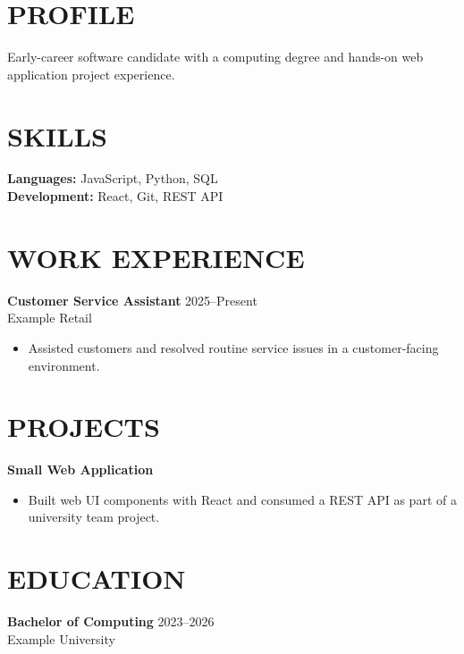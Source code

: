 

\section{PROFILE}
Early-career software candidate with a computing degree and hands-on web application project experience.
\section{SKILLS}
\textbf{Languages:} JavaScript, Python, SQL\\
\textbf{Development:} React, Git, REST API
\section{WORK EXPERIENCE}
\textbf{Customer Service Assistant} \hfill 2025--Present\\
Example Retail
\begin{itemize}
\item Assisted customers and resolved routine service issues in a customer-facing environment.
\end{itemize}
\section{PROJECTS}
\textbf{Small Web Application}
\begin{itemize}
\item Built web UI components with React and consumed a REST API as part of a university team project.
\end{itemize}
\section{EDUCATION}
\textbf{Bachelor of Computing} \hfill 2023--2026\\
Example University

